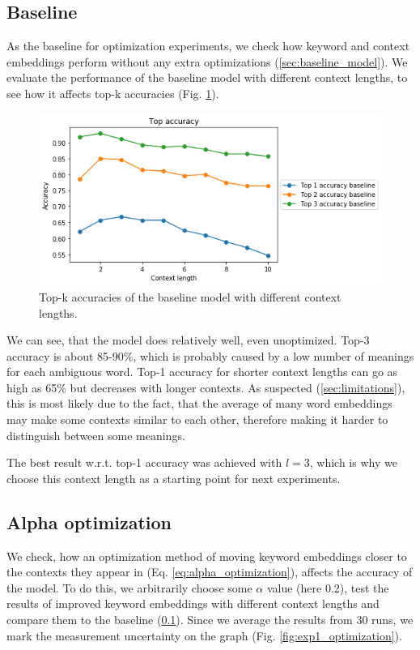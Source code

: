 \documentclass{llncs}
\begin{document}
\subsection{Baseline}
\label{sec:exp_baseline}
As the baseline for optimization experiments, we check how keyword and context embeddings perform without any extra optimizations (\ref{sec:baseline_model}).
We evaluate the performance of the baseline model with different context lengths, to see how it affects top-k accuracies (Fig. \ref{fig:baseline}).

\begin{figure}
    \centering
    \caption{Top-k accuracies of the baseline model with different context lengths.}
    \label{fig:baseline}
    \includegraphics[scale=0.5]{res/baseline_context_top_acc.png}
\end{figure}

We can see, that the model does relatively well, even unoptimized.
Top-3 accuracy is about 85-90\%, which is probably caused by a low number of meanings for each ambiguous word.
Top-1 accuracy for shorter context lengths can go as high as 65\% but decreases with longer contexts.
As suspected (\ref{sec:limitations}), this is most likely due to the fact, that the average of many word embeddings may make some contexts similar to each other, therefore making it harder to distinguish between some meanings.

The best result w.r.t. top-1 accuracy was achieved with \(l=3\), which is why we choose this context length as a starting point for next experiments.

\subsection{Alpha optimization}
\label{sec:exp_alpha}
We check, how an optimization method of moving keyword embeddings closer to the contexts they appear in (Eq. \ref{eq:alpha_optimization}), affects the accuracy of the model.
To do this, we arbitrarily choose some \(\alpha\) value (here 0.2), test the results of improved keyword embeddings with different context lengths and compare them to the baseline (\ref{sec:exp_baseline}). Since we average the results from 30 runs, we mark the measurement uncertainty on the graph (Fig. \ref{fig:exp1_optimization}).
\end{document}
